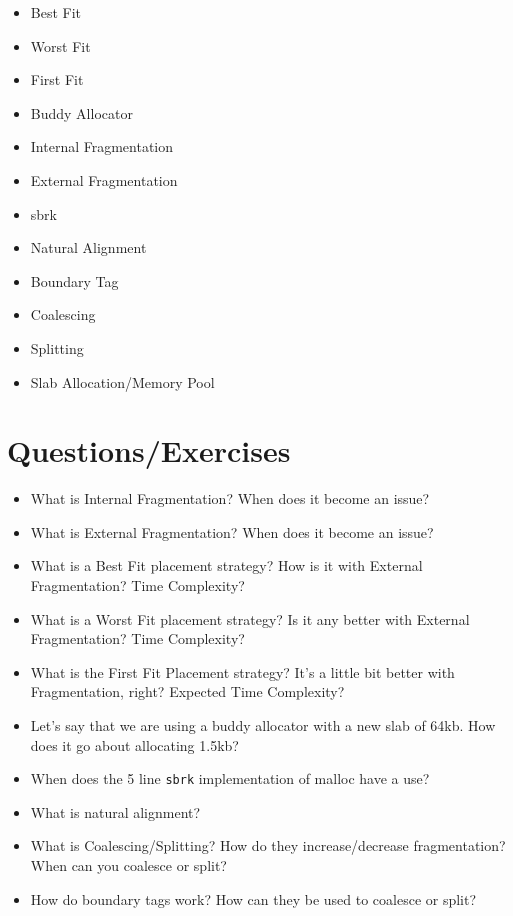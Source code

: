 \begin{itemize}
\tightlist
\item
  Best Fit
\item
  Worst Fit
\item
  First Fit
\item
  Buddy Allocator
\item
  Internal Fragmentation
\item
  External Fragmentation
\item
  sbrk
\item
  Natural Alignment
\item
  Boundary Tag
\item
  Coalescing
\item
  Splitting
\item
  Slab Allocation/Memory Pool
\end{itemize}

\section{Questions/Exercises}\label{questionsexercises}

\begin{itemize}
\tightlist
\item
  What is Internal Fragmentation? When does it become an issue?
\item
  What is External Fragmentation? When does it become an issue?
\item
  What is a Best Fit placement strategy? How is it with External
  Fragmentation? Time Complexity?
\item
  What is a Worst Fit placement strategy? Is it any better with External
  Fragmentation? Time Complexity?
\item
  What is the First Fit Placement strategy? It's a little bit better
  with Fragmentation, right? Expected Time Complexity?
\item
  Let's say that we are using a buddy allocator with a new slab of 64kb.
  How does it go about allocating 1.5kb?
\item
  When does the 5 line \texttt{sbrk} implementation of malloc have a
  use?
\item
  What is natural alignment?
\item
  What is Coalescing/Splitting? How do they increase/decrease
  fragmentation? When can you coalesce or split?
\item
  How do boundary tags work? How can they be used to coalesce or split?
\end{itemize}

